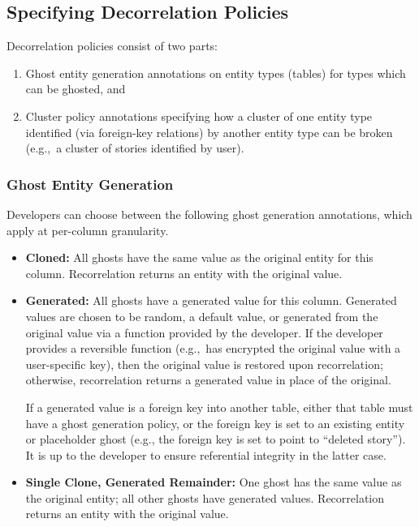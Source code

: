 \subsection{Specifying Decorrelation Policies}

Decorrelation policies consist of two parts: 
\begin{enumerate}
    \item Ghost entity generation annotations on entity types (tables) for types which can be ghosted, and 
    \item Cluster policy annotations specifying how a cluster of one entity type identified (via
        foreign-key relations) by another entity type can be broken (e.g.,\ a cluster of stories
        identified by user).
\end{enumerate}

\subsubsection{Ghost Entity Generation}
Developers can choose between the following ghost generation annotations, which apply at 
per-column granularity.
\begin{itemize}
    \item \textbf{Cloned:} All ghosts have the same value as the original entity for this column.
        Recorrelation returns an entity with the original value.

    \item \textbf{Generated:} All ghosts have a generated value for this column. Generated values are
chosen to be random, a default value, or generated from the original value via a function provided by the developer.
        If the developer provides a reversible function (e.g.,\ has encrypted the original value
        with a user-specific key), then the original value is restored upon
        recorrelation; otherwise, recorrelation returns a generated value in place of the original.

        If a generated value is a foreign key into another table, either that table must 
        have a ghost generation policy, or the foreign key is set to an existing entity or placeholder ghost (e.g.,
        the foreign key is set to point to ``deleted story''). It is up to the developer to ensure
        referential integrity in the latter case.

\item \textbf{Single Clone, Generated Remainder:} One ghost has the same value as the original
        entity; all other ghosts have generated values. Recorrelation returns an entity with the original value.
\end{itemize}

